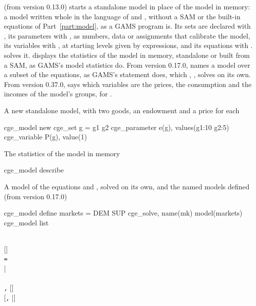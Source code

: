 

 (from version 0.13.0) starts a standalone model in place
of the model in memory: a model written whole in the language of
 and , without a SAM or the
built-in equations of Part~\ref{part:model}, as a GAMS program is. Its sets
are declared with , its parameters with
, as numbers, data or assignments that calibrate the
model, its variables with , at starting levels given by
expressions, and its equations with .
 solves it.  displays the
statistics of the model in memory, standalone or built from a SAM, as GAMS's
model statistics do. From version 0.17.0,  names a
model over a subset of the equations, as GAMS's  statement does,
which , , solves on its own. From version
0.37.0,  says which variables are the prices, the
consumption and the incomes of the model's groups, for .


A new standalone model, with two goods, an endowment and a price for each
\begin{stcode}
cge_model new
cge_set g = g1 g2
cge_parameter e(g), values(g1:10 g2:5)
cge_variable P(g), value(1)
\end{stcode}
The statistics of the model in memory
\begin{stcode}
cge_model describe
\end{stcode}
A model of the equations  and , solved on its own, and the
named models defined (from version 0.17.0)
\begin{stcode}
cge_model define markets = DEM SUP
cge_solve, name(mk) model(markets)
cge_model list
\end{stcode}


\begin{stsyntax}
\\
 \textbf{} []\\
  \texttt{=} \\
 |\\
\\
\texttt{,}     []\\
 [\texttt{,} |]
\end{stsyntax}

